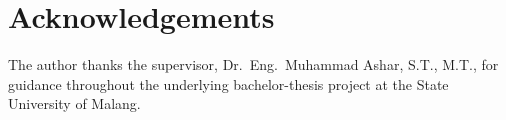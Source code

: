 \documentclass[conference]{IEEEtran}
\begin{document}
\section*{Acknowledgements}
The author thanks the supervisor, Dr.~Eng.~Muhammad Ashar, S.T., M.T.,
for guidance throughout the underlying bachelor-thesis project at the
State University of Malang.



\end{document}
